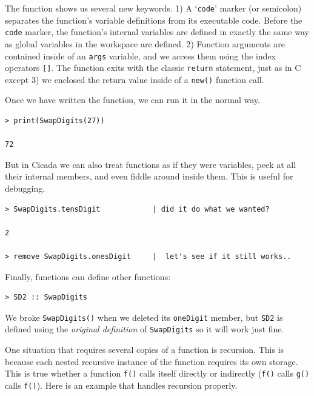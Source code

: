 \documentclass{article}
\newenvironment{code}{
       \begin{list}{}{
               \setlength{\leftmargin}{.4in}
               \setlength{\rightmargin}{0in}
               \setlength{\topsep}{.2in}
       }
       \small
       \item[] }
       { \end{list}   }
\begin{document}
\noindent The function shows us several new keywords.  1) A `\texttt{code}' marker (or semicolon) separates the function's variable definitions from its executable code.  Before the \verb#code# marker, the function's internal variables are defined in exactly the same way as global variables in the workspace are defined.  2) Function arguments are contained inside of an \texttt{args} variable, and we access them using the index operators \verb#[]#.  The function exits with the classic \texttt{return} statement, just as in C except 3) we enclosed the return value inside of a \verb#new()# function call.

Once we have written the function, we can run it in the normal way.

\begin{code} \begin{verbatim}
> print(SwapDigits(27))

72
\end{verbatim} \end{code}

\noindent But in Cicada we can also treat functions as if they were variables, peek at all their internal members, and even fiddle around inside them.  This is useful for debugging.

\begin{code} \begin{verbatim}
> SwapDigits.tensDigit            | did it do what we wanted?

2

> remove SwapDigits.onesDigit     |  let's see if it still works..
\end{verbatim} \end{code}

Finally, functions can define other functions:

\begin{code} \begin{verbatim}
> SD2 :: SwapDigits
\end{verbatim} \end{code}

\noindent We broke \verb#SwapDigits()# when we deleted its \verb#oneDigit# member, but \verb#SD2# is defined using the \emph{original definition} of \verb#SwapDigits# so it will work just fine.

One situation that requires several copies of a function is recursion.  This is because each nested recursive instance of the function requires its own storage.  This is true whether a function \verb#f()# calls itself directly or indirectly (\verb#f()# calls \verb#g()# calls \verb#f()#).  Here is an example that handles recursion properly.
\end{document}
